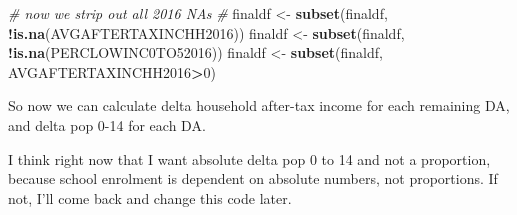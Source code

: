 \documentclass[]{article}
\newenvironment{Shaded}{\begin{snugshade}}{\end{snugshade}}
\newcommand{\CommentTok}[1]{\textcolor[rgb]{0.56,0.35,0.01}{\textit{#1}}}
\newcommand{\DecValTok}[1]{\textcolor[rgb]{0.00,0.00,0.81}{#1}}
\newcommand{\KeywordTok}[1]{\textcolor[rgb]{0.13,0.29,0.53}{\textbf{#1}}}
\newcommand{\NormalTok}[1]{#1}
\newcommand{\OperatorTok}[1]{\textcolor[rgb]{0.81,0.36,0.00}{\textbf{#1}}}
\newcommand{\StringTok}[1]{\textcolor[rgb]{0.31,0.60,0.02}{#1}}
\begin{document}
\begin{Shaded}
\end{Shaded}

\begin{Shaded}
\begin{Highlighting}[]
\CommentTok{# now we strip out all 2016 NAs}
\CommentTok{#}
\NormalTok{finaldf <-}\StringTok{ }\KeywordTok{subset}\NormalTok{(finaldf, }\OperatorTok{!}\KeywordTok{is.na}\NormalTok{(AVGAFTERTAXINCHH2016))}
\NormalTok{finaldf <-}\StringTok{ }\KeywordTok{subset}\NormalTok{(finaldf, }\OperatorTok{!}\KeywordTok{is.na}\NormalTok{(PERCLOWINC0TO52016))}
\NormalTok{finaldf <-}\StringTok{ }\KeywordTok{subset}\NormalTok{(finaldf, AVGAFTERTAXINCHH2016}\OperatorTok{>}\DecValTok{0}\NormalTok{)}
\end{Highlighting}
\end{Shaded}

So now we can calculate delta household after-tax income for each
remaining DA, and delta pop 0-14 for each DA.

I think right now that I want absolute delta pop 0 to 14 and not a
proportion, because school enrolment is dependent on absolute numbers,
not proportions. If not, I'll come back and change this code later.
\end{document}
